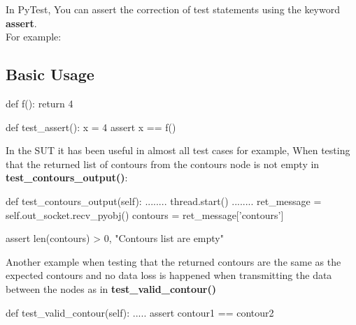 In PyTest, You can assert the correction of test statements using the keyword \textbf{assert}. \\
For example:

\subsection{Basic Usage}

\begin{python}
def f():
    return 4
    
def test_assert():
    x = 4
    assert x == f()
\end{python}

In the SUT it has been useful in almost all test cases for example, When testing that the returned list of contours from the contours node is not empty in \textbf{test\_contours\_output()}: \\

\begin{python}
def test_contours_output(self):
    ........
    thread.start()
    ........
    ret_message = self.out_socket.recv_pyobj()
    contours = ret_message['contours']

    assert len(contours) > 0, "Contours list are empty"
\end{python}

Another example when testing that the returned contours are the same as the expected contours and no data loss is happened when transmitting the data between the nodes as in \textbf{test\_valid\_contour()}

\begin{python}
def test_valid_contour(self):
    .....
    assert contour1 == contour2
\end{python}


